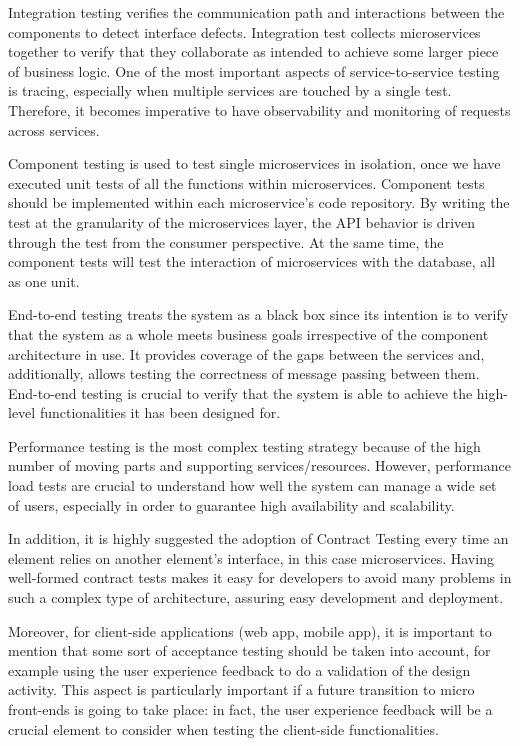 Integration testing verifies the communication path and interactions between the components to detect interface defects. Integration test collects microservices together to verify that they collaborate as intended to achieve some larger piece of business logic.
One of the most important aspects of service-to-service testing is tracing, especially when multiple services are touched by a single test. Therefore, it becomes imperative to have observability and monitoring of requests across services.
\newline

Component testing is used to test single microservices in isolation, once we have executed unit tests of all the functions within microservices. Component tests should be implemented within each microservice’s code repository. By writing the test at the granularity of the microservices layer, the API behavior is driven through the test from the consumer perspective. At the same time, the component tests will test the interaction of microservices with the database, all as one unit.
\newline

End-to-end testing treats the system as a black box since its intention is to verify that the system as a whole meets business goals irrespective of the component architecture in use. It provides coverage of the gaps between the services and, additionally, allows testing the  correctness of message passing between them. End-to-end testing is crucial to verify that the system is able to achieve the high-level functionalities it has been designed for.
\newline

Performance testing is the most complex testing strategy because of the high number of moving parts and supporting services/resources. However, performance load tests are crucial to understand how well the system can manage a wide set of users, especially in order to guarantee high availability and scalability.
\newline

In addition, it is highly suggested the adoption of Contract Testing every time an element relies on another element’s interface, in this case microservices. Having well-formed contract tests makes it easy for developers to avoid many problems in such a complex type of architecture, assuring easy development and deployment.
\newline

Moreover, for client-side applications (web app, mobile app), it is important to mention that some sort of acceptance testing should be taken into account, for example using the user experience feedback to do a validation of the design activity. This aspect is particularly important if a future transition to micro front-ends is going to take place: in fact, the user experience feedback will be a crucial element to consider when testing the client-side functionalities.
\newline

